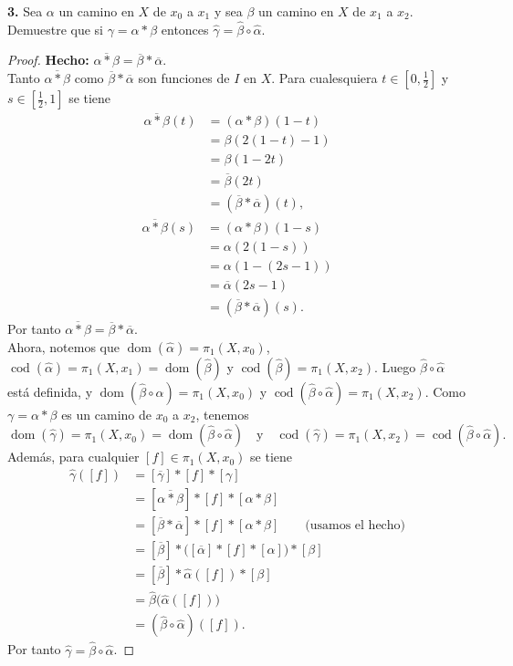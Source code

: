 \newcommand{\pig}{\pi_1}
\textbf{3.} Sea $\alpha$ un camino en $X$ de $x_0$ a $x_1$ y sea $\beta$ un camino en $X$ de $x_1$ a $x_2$. Demuestre que si $\gamma=\alpha*\beta$ entonces $\widehat\gamma=\widehat\beta\circ\widehat\alpha$.
\begin{proof}
\textbf{Hecho:} $\overline{\alpha*\beta}=\overline{\beta}*\overline{\alpha}$.\\
Tanto $\overline{\alpha*\beta}$ como $\overline{\beta}*\overline{\alpha}$ son funciones de $I$ en $X$. Para cualesquiera $t\in[0,\tfrac12]$ y $s\in[\tfrac12,1]$ se tiene
   \begin{align*}
      \overline{\alpha*\beta}(t)&=(\alpha*\beta)(1-t)\\
      &=\beta(2(1-t)-1)\\
      &=\beta(1-2t)\\
      &=\overline{\beta}(2t)\\
      &=(\overline{\beta}*\overline{\alpha})(t),
      \end{align*}
      \begin{align*}
      \overline{\alpha*\beta}(s)&=(\alpha*\beta)(1-s)\\
      &=\alpha(2(1-s))\\
      &=\alpha(1-(2s-1))\\
      &=\overline{\alpha}(2s-1)\\
      &=(\overline{\beta}*\overline{\alpha})(s).
   \end{align*}
Por tanto $\overline{\alpha*\beta}=\overline{\beta}*\overline{\alpha}$.\\
Ahora, notemos que $\operatorname{dom}(\widehat\alpha)=\pig(X,x_0)$, $\operatorname{cod}(\widehat\alpha)=\pig(X,x_1)=\operatorname{dom}(\widehat\beta)$ y $\operatorname{cod}(\widehat\beta)=\pig(X,x_2)$. Luego $\widehat\beta\circ\widehat\alpha$ está definida, y $\operatorname{dom}(\widehat\beta\circ\widehat\alpha)=\pig(X,x_0)$ y $\operatorname{cod}(\widehat\beta\circ\widehat\alpha)=\pig(X,x_2)$. Como $\gamma=\alpha*\beta$ es un camino de $x_0$ a $x_2$, tenemos
   \[
      \operatorname{dom}(\widehat\gamma)=\pig(X,x_0)=\operatorname{dom}(\widehat\beta\circ\widehat\alpha)
      \quad\text{y}\quad
      \operatorname{cod}(\widehat\gamma)=\pig(X,x_2)=\operatorname{cod}(\widehat\beta\circ\widehat\alpha).
   \]
Además, para cualquier $[f]\in\pig(X,x_0)$ se tiene
   \begin{align*}
      \widehat\gamma([f])&=[\overline{\gamma}]*[f]*[\gamma]\\
      &=[\overline{\alpha*\beta}]*[f]*[\alpha*\beta]\\
      &=[\overline{\beta}*\overline{\alpha}]*[f]*[\alpha*\beta]
      \qquad\text{(usamos el hecho)}\\
      &=[\overline{\beta}]*\bigl([\overline{\alpha}]*[f]*[\alpha]\bigr)*[\beta]\\
      &=[\overline{\beta}]*\widehat\alpha([f])*[\beta]\\
      &=\widehat\beta\bigl(\widehat\alpha([f])\bigr)\\
      &=(\widehat\beta\circ\widehat\alpha)([f]).
   \end{align*}
Por tanto $\widehat\gamma=\widehat\beta\circ\widehat\alpha$.
\end{proof}
\clearpage
